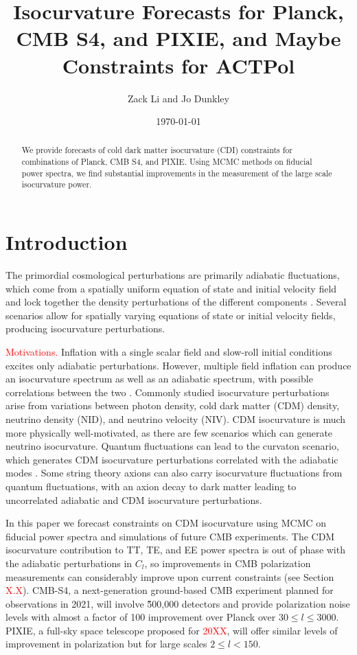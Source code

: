 \documentclass{emulateapj}
\newcommand\writingnote[1]{\textcolor{red}{#1}}
\begin{document}
\title{Isocurvature Forecasts for Planck, CMB S4, and PIXIE, and Maybe Constraints for ACTPol}
\author{Zack Li and Jo Dunkley}
\date{\today}
{}


\begin{abstract}
We provide forecasts of cold dark matter isocurvature (CDI) constraints for combinations of Planck, CMB S4, and PIXIE. Using MCMC methods on fiducial power spectra, we find substantial improvements in the measurement of the large scale isocurvature power.
\end{abstract}

\section{Introduction}

The primordial cosmological perturbations are primarily adiabatic fluctuations, which come from a spatially uniform equation of state and initial velocity field and lock together the density perturbations of the different components \citep{planckXXII:2013}.  Several scenarios allow for spatially varying equations of state or initial velocity fields, producing isocurvature perturbations.

\writingnote{Motivations.}
Inflation with a single scalar field and slow-roll initial conditions excites only adiabatic perturbations. However, multiple field inflation can produce an isocurvature spectrum as well as an adiabatic spectrum, with possible correlations between the two \citep{langlois:1999}. Commonly studied isocurvature perturbations arise from variations between photon density, cold dark matter (CDM) density, neutrino density (NID), and neutrino velocity (NIV). CDM isocurvature is much more physically well-motivated, as there are few scenarios which can generate neutrino isocurvature. Quantum fluctuations can lead to the curvaton scenario, which generates CDM isocurvature perturbations correlated with the adiabatic modes \citep{baumann/etal:2009}. Some string theory axions can also carry isocurvature fluctuations from quantum fluctuations, with an axion decay to dark matter leading to uncorrelated adiabatic and CDM isocurvature perturbations.

In this paper we forecast constraints on CDM isocurvature using MCMC on fiducial power spectra and simulations of future CMB experiments. The CDM isocurvature contribution to TT, TE, and EE power spectra is out of phase with the adiabatic perturbations in $C_l$, so improvements in CMB polarization measurements can considerably improve upon current constraints (see Section \writingnote{X.X}). CMB-S4, a next-generation ground-based CMB experiment planned for observations in 2021, will involve \~500,000 detectors and provide polarization noise levels with almost a factor of 100 improvement over Planck over $30 \leq l \leq 3000$. PIXIE, a full-sky space telescope proposed for \writingnote{20XX}, will offer similar levels of improvement in polarization but for large scales $2 \leq l < 150$. 
\end{document}

